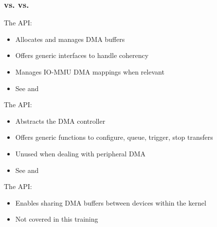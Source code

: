 \begin{frame}
  \frametitle{ vs.  vs. }
  The  API:
  \begin{itemize}
  \item Allocates and manages DMA buffers
  \item Offers generic interfaces to handle coherency
  \item Manages IO-MMU DMA mappings when relevant
  \item See  and
  \end{itemize}
  The  API:
  \begin{itemize}
  \item Abstracts the DMA controller
  \item Offers generic functions to configure, queue, trigger, stop
    transfers
  \item Unused when dealing with peripheral DMA
  \item See  and
  \end{itemize}
  The  API:
  \begin{itemize}
  \item Enables sharing DMA buffers between devices within the kernel
  \item Not covered in this training
  \end{itemize}
\end{frame}

